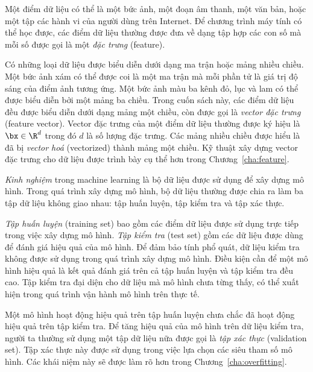 Một điểm dữ liệu có thể là một bức ảnh, một đoạn âm thanh, một văn bản, hoặc một
tập các hành vi của người dùng trên Internet. Để chương trình máy tính có thể
học được, các điểm dữ liệu thường được đưa về dạng tập hợp các con số mà mỗi số
được gọi là một \textit{đặc trưng} (feature).


Có những loại dữ liệu được biểu diễn dưới dạng ma trận hoặc mảng nhiều chiều.
Một bức ảnh xám có thể được coi là một ma trận mà mỗi phần tử là giá trị độ sáng
của điểm ảnh tương ứng. Một bức ảnh màu ba kênh đỏ, lục và lam có thể được biểu
diễn bởi một mảng ba chiều. Trong cuốn sách này, các điểm dữ liệu đều được biểu
diễn dưới dạng mảng một chiều, còn được gọi là \textit{vector đặc trưng} (feature vector). Vector đặc trưng của một điểm dữ liệu thường được ký hiệu là $\bx \in \R^d$ trong đó $d$ là số lượng đặc trưng. Các mảng nhiều chiều được hiểu là đã bị \textit{vector hoá} (vectorized) thành mảng một chiều. Kỹ thuật xây dựng vector đặc trưng cho dữ liệu được trình bày cụ thể hơn trong Chương~\ref{cha:feature}.

\textit{Kinh nghiệm} trong machine learning là bộ dữ liệu được sử dụng để xây
dựng mô hình. Trong quá trình xây dựng mô hình, bộ dữ liệu thường được chia ra
làm ba tập dữ liệu không giao nhau: tập huấn luyện, tập kiểm tra và tập xác thực.




\textit{Tập huấn luyện} (training set) bao gồm các điểm dữ liệu được sử dụng trực tiếp trong việc xây dựng mô hình. \textit{Tập kiểm tra} (test set) gồm các dữ liệu được dùng để đánh giá hiệu quả của mô hình. Để đảm bảo tính phổ quát, dữ liệu kiểm tra không được sử dụng trong quá trình xây dựng mô hình. Điều kiện cần để một mô hình hiệu quả là kết quả đánh giá trên cả tập huấn luyện và tập kiểm tra đều cao. Tập kiểm tra đại diện cho dữ liệu mà mô hình chưa từng thấy, có thể xuất hiện trong quá trình vận hành mô hình trên thực tế. 

Một mô hình hoạt động hiệu quả trên tập huấn luyện chưa chắc đã hoạt động hiệu quả trên tập kiểm tra. Để tăng hiệu quả của mô hình trên dữ liệu kiểm tra, người ta thường sử dụng một tập dữ liệu nữa được gọi là \textit{tập xác thực} (validation set). Tập xác thực này được sử dụng trong việc lựa chọn các siêu tham số mô hình. Các khái niệm này sẽ được làm rõ hơn trong Chương~\ref{cha:overfitting}. 
 

